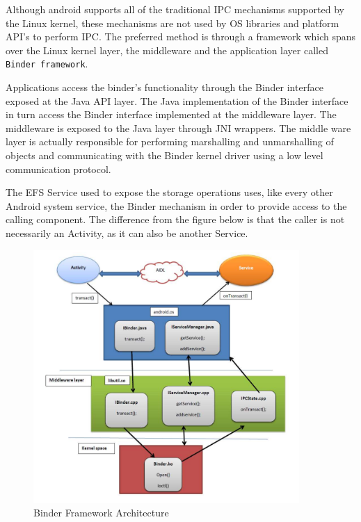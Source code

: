 Although android supports all of the traditional IPC mechanisms supported by the Linux kernel, these mechanisms are not used by OS libraries and platform API's to perform IPC. The preferred method is through a framework which spans over the Linux kernel layer, the middleware and the application layer called \texttt{Binder framework}.

Applications access the binder’s functionality through the Binder interface exposed at the Java API layer. The Java implementation of the Binder interface in turn access the Binder interface implemented at the middleware layer. The middleware is exposed to the Java layer through JNI wrappers. The middle ware layer is actually responsible for performing marshalling and unmarshalling of objects and communicating with the Binder kernel driver using a low level communication protocol.

The EFS Service used to expose the storage operations uses, like every other Android system service, the Binder mechanism in order to provide access to the calling component. The difference from the figure below is that the caller is not necessarily an Activity, as it can also be another Service.

\begin{figure}[h!]
\centering
    \includegraphics[width=0.9\textwidth]{src/img/binder/binderarch.png}
\caption{Binder Framework Architecture}
\end{figure}

